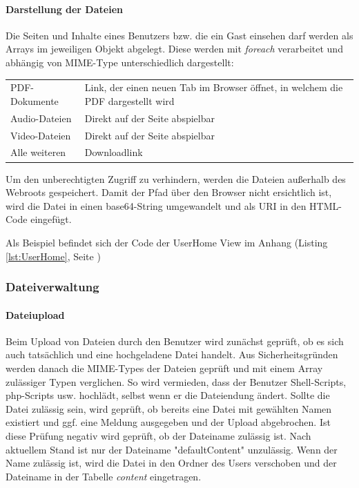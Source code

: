 \documentclass[10.5pt]{scrarticle}
\begin{document}
\paragraph{Darstellung der Dateien}

Die Seiten und Inhalte eines Benutzers bzw. die ein Gast einsehen darf werden als Arrays im jeweiligen Objekt abgelegt. Diese werden mit \textit{foreach} verarbeitet und abhängig von MIME-Type unterschiedlich dargestellt:

\FloatBarrier
\begin{table}[ht!]
\begin{tabular}{ll}
PDF-Dokumente & Link, der einen neuen Tab im Browser öffnet, in welchem die PDF dargestellt wird \\
Audio-Dateien & Direkt auf der Seite abspielbar \\
Video-Dateien & Direkt auf der Seite abspielbar \\
Alle weiteren & Downloadlink

\end{tabular}
\end{table}
\FloatBarrier

Um den unberechtigten Zugriff zu verhindern, werden die Dateien au{\ss}erhalb des Webroots gespeichert. Damit der Pfad über den Browser nicht ersichtlich ist, wird die Datei in einen base64-String umgewandelt und als URI in den HTML-Code eingefügt.

Als Beispiel befindet sich der Code der UserHome View im Anhang (Listing \ref{lst:UserHome}, Seite \pageref{lst:UserHome})

\subsubsection{Dateiverwaltung}

\paragraph{Dateiupload}

Beim Upload von Dateien durch den Benutzer wird zunächst geprüft, ob es sich auch tatsächlich und eine hochgeladene Datei handelt. Aus Sicherheitsgründen werden danach die MIME-Types der Dateien geprüft und mit einem Array zulässiger Typen verglichen. So wird vermieden, dass der Benutzer Shell-Scripts, php-Scripts usw. hochlädt, selbst wenn er die Dateiendung ändert. Sollte die Datei zulässig sein, wird geprüft, ob bereits eine Datei mit gewählten Namen existiert und ggf. eine Meldung ausgegeben und der Upload abgebrochen. Ist diese Prüfung negativ wird geprüft, ob der Dateiname zulässig ist. Nach aktuellem Stand ist nur der Dateiname "defaultContent" unzulässig. Wenn der Name zulässig ist, wird die Datei in den Ordner des Users verschoben und der Dateiname in der Tabelle \textit{content} eingetragen.
\end{document}
